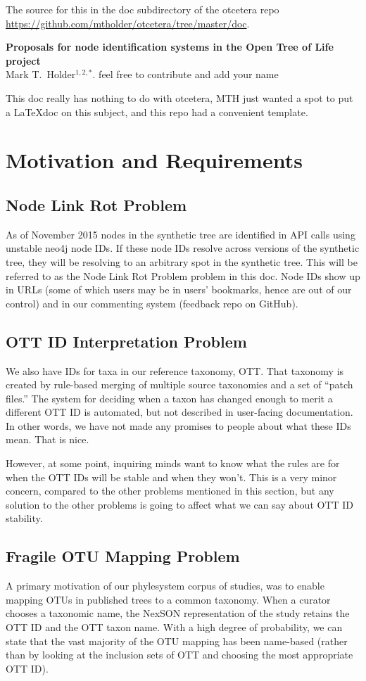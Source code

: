 \documentclass[11pt]{article}
\newcommand{\nodeLinkRot}{Node Link Rot Problem\xspace}
\newcommand{\ottIdInterpretation}{OTT ID Interpretation Problem\xspace}
\newcommand{\fragileOTUMapping}{Fragile OTU Mapping Problem\xspace}
\begin{document}
The source for this in the doc subdirectory of the otcetera
    repo \url{https://github.com/mtholder/otcetera/tree/master/doc}.
\begin{center}
    {\bf Proposals for node identification systems in the Open Tree of Life project} \\
{Mark T.~Holder$^{1,2,\ast}$. feel free to contribute and add your name}
\end{center}
This doc really has nothing to do with otcetera, MTH just wanted a spot to
put a \LaTeX doc on this subject, and this repo had a convenient template.

\tableofcontents
\section{Motivation and Requirements}
\subsection{\nodeLinkRot}
As of November 2015 nodes in the synthetic tree are identified in API calls
    using unstable neo4j node IDs.
If these node IDs resolve across versions of the synthetic tree, they will be
    resolving to an arbitrary spot in the synthetic tree.
This will be referred to as the \nodeLinkRot problem in this doc.
Node IDs show up in URLs (some of which users may be in users' bookmarks, hence
    are out of our control) and in our commenting system (feedback repo on GitHub).

\subsection{\ottIdInterpretation}
We also have IDs for taxa in our reference taxonomy, OTT.
That taxonomy is created by rule-based merging of multiple source taxonomies and
    a set of ``patch files.''
The system for deciding when a taxon has changed enough to merit a different OTT ID
    is automated, but not described in user-facing documentation.
In other words, we have not made any promises to people about what these IDs mean.
That is nice.

However, at some point, inquiring minds want to know what the rules are for when
  the OTT IDs will be stable and when they won't.
This is a very minor concern, compared to the other problems mentioned in this section,
  but any solution to the other problems is going to affect what we can say 
  about OTT ID stability.

\subsection{\fragileOTUMapping}
A primary motivation of our phylesystem corpus of studies, was to enable
  mapping OTUs in published trees to a common taxonomy.
When a curator chooses a taxonomic name, the NexSON representation of the study
  retains the OTT ID and the OTT taxon name.
With a high degree of probability, we can state that the vast majority of the 
  OTU mapping has been name-based (rather than by looking at the inclusion
    sets of OTT and choosing the most appropriate OTT ID).
\end{document}
